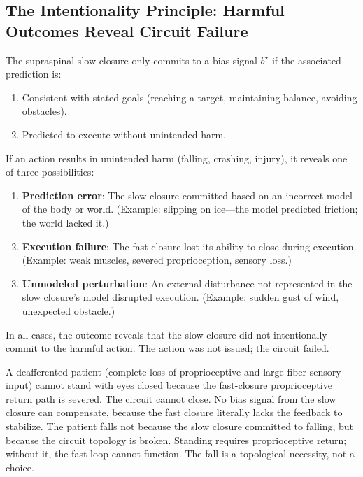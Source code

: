 \subsection{The Intentionality Principle: Harmful Outcomes Reveal Circuit Failure}

\begin{principle}
\label{prin:intentionality}
The supraspinal slow closure only commits to a bias signal $b^{\star}$ if the associated prediction is:
\begin{enumerate}[label=(\roman*),leftmargin=*,itemsep=1pt]
\item Consistent with stated goals (reaching a target, maintaining balance, avoiding obstacles).
\item Predicted to execute without unintended harm.
\end{enumerate}

If an action results in unintended harm (falling, crashing, injury), it reveals one of three possibilities:
\begin{enumerate}[label=(\alph*),leftmargin=*,itemsep=1pt]
\item \textbf{Prediction error}: The slow closure committed based on an incorrect model of the body or world. (Example: slipping on ice—the model predicted friction; the world lacked it.)
\item \textbf{Execution failure}: The fast closure lost its ability to close during execution. (Example: weak muscles, severed proprioception, sensory loss.)
\item \textbf{Unmodeled perturbation}: An external disturbance not represented in the slow closure's model disrupted execution. (Example: sudden gust of wind, unexpected obstacle.)
\end{enumerate}

In all cases, the outcome reveals that the slow closure did not intentionally commit to the harmful action. The action was not issued; the circuit failed.
\end{principle}

\begin{remark}
A deafferented patient (complete loss of proprioceptive and large-fiber sensory input) cannot stand with eyes closed because the fast-closure proprioceptive return path is severed. The circuit cannot close. No bias signal from the slow closure can compensate, because the fast closure literally lacks the feedback to stabilize. The patient falls not because the slow closure committed to falling, but because the circuit topology is broken. Standing requires proprioceptive return; without it, the fast loop cannot function. The fall is a topological necessity, not a choice.
\end{remark}

